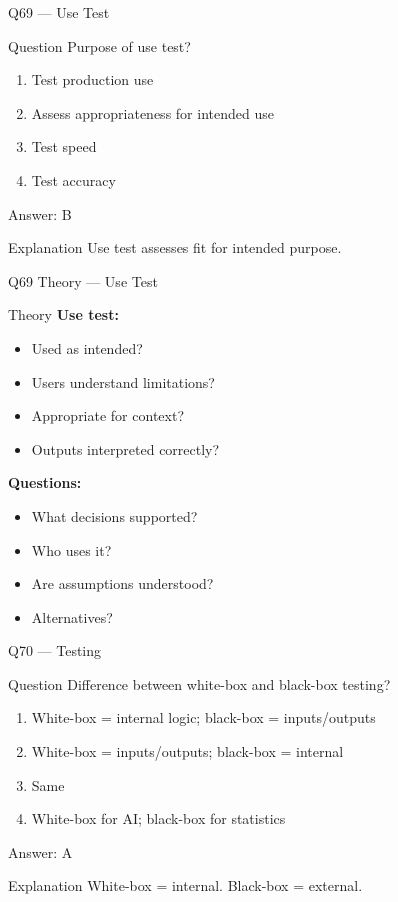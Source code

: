 \documentclass[aspectratio=169,8pt]{beamer}
\begin{document}
	\begin{frame}{Q69 --- Use Test}
		\begin{block}{Question}
			Purpose of use test?
		\end{block}
		\begin{enumerate}[label=\Alph*.]
			\item Test production use
			\item Assess appropriateness for intended use
			\item Test speed
			\item Test accuracy
		\end{enumerate}
		\begin{exampleblock}{Answer: B}
		\end{exampleblock}
		\begin{block}{Explanation}
			Use test assesses fit for intended purpose.
		\end{block}
	\end{frame}
	
	\begin{frame}{Q69 Theory --- Use Test}
		\begin{block}{Theory}
			\textbf{Use test:}
			\begin{itemize}
				\item Used as intended?
				\item Users understand limitations?
				\item Appropriate for context?
				\item Outputs interpreted correctly?
			\end{itemize}
			\textbf{Questions:}
			\begin{itemize}
				\item What decisions supported?
				\item Who uses it?
				\item Are assumptions understood?
				\item Alternatives?
			\end{itemize}
		\end{block}
	\end{frame}
	
	\begin{frame}{Q70 --- Testing}
		\begin{block}{Question}
			Difference between white-box and black-box testing?
		\end{block}
		\begin{enumerate}[label=\Alph*.]
			\item White-box = internal logic; black-box = inputs/outputs
			\item White-box = inputs/outputs; black-box = internal
			\item Same
			\item White-box for AI; black-box for statistics
		\end{enumerate}
		\begin{exampleblock}{Answer: A}
		\end{exampleblock}
		\begin{block}{Explanation}
			White-box = internal. Black-box = external.
		\end{block}
	\end{frame}
	
\end{document}
